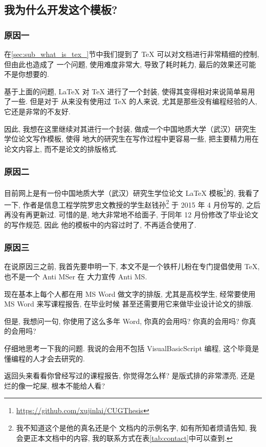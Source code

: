 \documentclass{cugthesis}
\begin{document}
\subsection{我为什么开发这个模板?}
\subsubsection{原因一}
    在\ref{sec:sub_what_is_tex_}节中我们提到了 \TeX{} 可以对文档进行非常精细的控制, 但由此也造成了
    一个问题, 使用难度非常大, 导致了耗时耗力, 最后的效果还可能不是你想要的. 

    基于上面的问题, \LaTeX{} 对 \TeX{} 进行了一个封装, 使得其变得相对来说简单易用了一些. 但是对于
    从来没有使用过 \TeX{} 的人来说, 尤其是那些没有编程经验的人, 它还是非常的不友好. 

    因此, 我想在这里继续对其进行一个封装, 做成一个中国地质大学（武汉）研究生学位论文写作模板, 使得
    地大的研究生在写作过程中更容易一些, 把主要精力用在论文内容上, 而不是论文的排版格式. 

\subsubsection{原因二}
    目前网上是有一份中国地质大学（武汉）研究生学位论文 \LaTeX{} 模板\footnote{\url{https://github.com/xujinlai/CUGThesis}}的, 
    我看了一下, 作者是信息工程学院罗忠文教授的学生赵钱孙\footnote{我不知道这个是他的真名还是个
    文档内的示例名字, 如有所知者烦请告知, 我会更正本文档中的内容, 我的联系方式在表\ref{tab:contact}中可以查到. }
    于 2015 年 4 月份写的, 之后再没有再更新过. 可惜的是, 地大非常地不给面子, 于同年 12 月份修改了毕业论文的写作规范, 因此
    他的模板中的内容过时了, 不再适合使用了.
    
\subsubsection{原因三}
    在说原因三之前, 我首先要申明一下, 本文不是一个铁杆儿粉在专门提倡使用 \TeX{}, 也不是一个 Anti MSer 在
    大力宣传 Anti MS. 

    现在基本上每个人都在用 MS Word 做文字的排版, 尤其是高校学生, 经常要使用 MS Word 来写课程报告, 在毕业时候
    甚至还需要用它来做毕业设计论文的排版. 

    但是, 我想问一句, 你使用了这么多年 Word, 你真的会用吗? 你真的会用吗? 你真的会用吗? 

    仔细地思考一下我的问题. 我说的会用不包括 VisualBasicScript 编程, 这个毕竟是懂编程的人才会去研究的.

    返回头来看看你曾经写过的课程报告, 你觉得怎么样? 是版式排的非常漂亮, 还是烂的像一坨屎, 根本不能给人看?
\end{document}
